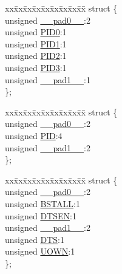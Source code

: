 \begin{DoxyCompactItemize}
\begin{tabbing}
\end{tabbing}\item 
\begin{tabbing}
xx\=xx\=xx\=xx\=xx\=xx\=xx\=xx\=xx\=\kill
struct \{\\
\>unsigned \hyperlink{union___b_d___s_t_a_t_adf71f3d8410c1f1dbbc96680a92c49af}{\_\_pad0\_\_}:2\\
\>unsigned \hyperlink{union___b_d___s_t_a_t_a810a2f6d15fc42c5d1e610b6e927d2eb}{PID0}:1\\
\>unsigned \hyperlink{union___b_d___s_t_a_t_acefd8c6eba334031c18cd877dfe08bfb}{PID1}:1\\
\>unsigned \hyperlink{union___b_d___s_t_a_t_aef3d6a9445a3c61d870212360c0a6110}{PID2}:1\\
\>unsigned \hyperlink{union___b_d___s_t_a_t_a771971768126aebea428ac7194b17fc0}{PID3}:1\\
\>unsigned \hyperlink{union___b_d___s_t_a_t_acaf2d0924a107ec6e8d2e31febaf66f9}{\_\_pad1\_\_}:1\\
\}; \\

\end{tabbing}\item 
\begin{tabbing}
xx\=xx\=xx\=xx\=xx\=xx\=xx\=xx\=xx\=\kill
struct \{\\
\>unsigned \hyperlink{union___b_d___s_t_a_t_adf71f3d8410c1f1dbbc96680a92c49af}{\_\_pad0\_\_}:2\\
\>unsigned \hyperlink{union___b_d___s_t_a_t_a97b41b25e06fd7857dcc6217c160a8ad}{PID}:4\\
\>unsigned \hyperlink{union___b_d___s_t_a_t_acaf2d0924a107ec6e8d2e31febaf66f9}{\_\_pad1\_\_}:2\\
\}; \\

\end{tabbing}\item 
\begin{tabbing}
xx\=xx\=xx\=xx\=xx\=xx\=xx\=xx\=xx\=\kill
struct \{\\
\>unsigned \hyperlink{union___b_d___s_t_a_t_adf71f3d8410c1f1dbbc96680a92c49af}{\_\_pad0\_\_}:2\\
\>unsigned \hyperlink{union___b_d___s_t_a_t_a145ee75f12c62d2a89097d18477019f2}{BSTALL}:1\\
\>unsigned \hyperlink{union___b_d___s_t_a_t_adeff6f5de2d8ca0cfa956560288c3541}{DTSEN}:1\\
\>unsigned \hyperlink{union___b_d___s_t_a_t_acaf2d0924a107ec6e8d2e31febaf66f9}{\_\_pad1\_\_}:2\\
\>unsigned \hyperlink{union___b_d___s_t_a_t_a74db087bfe32cd33c459191f7a4aeb13}{DTS}:1\\
\>unsigned \hyperlink{union___b_d___s_t_a_t_abc982c28d59f8e36dbcb06639010169d}{UOWN}:1\\
\}; \\


\end{tabbing}
\end{DoxyCompactItemize}

